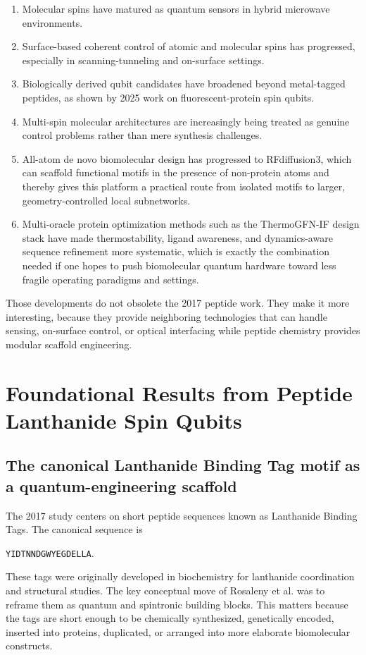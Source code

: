 \documentclass[11pt]{report}
\newcommand{\lbt}{Lanthanide Binding Tag}
\newcommand{\etal}{et al.}
\theoremstyle{definition}
\begin{document}
\begin{enumerate}[leftmargin=2em]
\item Molecular spins have matured as quantum sensors in hybrid microwave environments.
\item Surface-based coherent control of atomic and molecular spins has progressed, especially in scanning-tunneling and on-surface settings.
\item Biologically derived qubit candidates have broadened beyond metal-tagged peptides, as shown by 2025 work on fluorescent-protein spin qubits.
\item Multi-spin molecular architectures are increasingly being treated as genuine control problems rather than mere synthesis challenges.
\item All-atom de novo biomolecular design has progressed to RFdiffusion3, which can scaffold functional motifs in the presence of non-protein atoms and thereby gives this platform a practical route from isolated motifs to larger, geometry-controlled local subnetworks.
\item Multi-oracle protein optimization methods such as the ThermoGFN-IF design stack have made thermostability, ligand awareness, and dynamics-aware sequence refinement more systematic, which is exactly the combination needed if one hopes to push biomolecular quantum hardware toward less fragile operating paradigms and settings.
\end{enumerate}

Those developments do not obsolete the 2017 peptide work. They make it more interesting, because they provide neighboring technologies that can handle sensing, on-surface control, or optical interfacing while peptide chemistry provides modular scaffold engineering.

\chapter{Foundational Results from Peptide Lanthanide Spin Qubits}

\section{The canonical \lbt{} motif as a quantum-engineering scaffold}
The 2017 study centers on short peptide sequences known as \lbt s. The canonical sequence is
\begin{center}
\texttt{YIDTNNDGWYEGDELLA}.
\end{center}
These tags were originally developed in biochemistry for lanthanide coordination and structural studies. The key conceptual move of Rosaleny \etal{} was to reframe them as quantum and spintronic building blocks. This matters because the tags are short enough to be chemically synthesized, genetically encoded, inserted into proteins, duplicated, or arranged into more elaborate biomolecular constructs.
\end{document}
